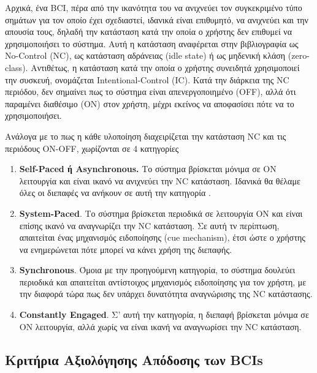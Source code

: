 \documentclass[11pt,a4paper,english,greek,twoside]{../Thesis}
\begin{document}
\par Αρχικά, ένα BCI, πέρα από την ικανότητα του να ανιχνεύει τον συγκεκριμένο τύπο σημάτων για τον οποίο έχει σχεδιαστεί, ιδανικά είναι επιθυμητό, να ανιχνεύει και την απουσία τους, δηλαδή την κατάσταση κατά την οποία ο χρήστης δεν επιθυμεί να χρησιμοποιήσει το σύστημα. Αυτή η κατάσταση αναφέρεται στην βιβλιογραφία ως No-Control (NC), ως κατάσταση αδράνειας (idle state) ή ως μηδενική κλάση (zero-class). Αντιθέτως, η κατάσταση κατά την οποία ο χρήστης συνειδητά χρησιμοποιεί την συσκευή, ονομάζεται Intentional-Control (IC). Κατά την διάρκεια της NC περιόδου, δεν σημαίνει πως το σύστημα είναι απενεργοποιημένο (OFF), αλλά ότι παραμένει διαθέσιμο (ON) στον χρήστη, μέχρι εκείνος να αποφασίσει πότε να το χρησιμοποιήσει. 

\par Ανάλογα με το πως η κάθε υλοποίηση διαχειρίζεται την κατάσταση NC και τις περιόδους ON-OFF, χωρίζονται σε 4 κατηγορίες \cite{Mason2006-ts}
\begin{enumerate}
    \item \textbf{Self-Paced ή Asynchronous.} Το σύστημα βρίσκεται μόνιμα σε ON λειτουργία και είναι ικανό να ανιχνεύει την NC κατάσταση. Ιδανικά θα θέλαμε όλες οι διεπαφές να ανήκουν σε αυτή την κατηγορία \cite{Muller-Putz2006-wj}. 
    \label{item:asynchronous}
    \item \textbf{System-Paced}. Το σύστημα βρίσκεται περιοδικά σε λειτουργία ON και είναι επίσης ικανό να αναγνωρίζει την NC κατάσταση. Σε αυτή τν περίπτωση, απαιτείται ένας μηχανισμός ειδοποίησης (cue mechanism), έτσι ώστε ο χρήστης να ενημερώνεται πότε μπορεί να κάνει χρήση της διεπαφής.
    \item \textbf{Synchronous}. Όμοια με την προηγούμενη κατηγορία, το σύστημα δουλεύει περιοδικά και απαιτείται αντίστοιχος μηχανισμός ειδοποίησης για τον χρήστη, με την διαφορά τώρα πως δεν υπάρχει δυνατότητα αναγνώρισης της NC κατάστασης.
    \item \textbf{Constantly Engaged}. Σ' αυτή την κατηγορία, η διεπαφή βρίσκεται μόνιμα σε ON λειτουργία, αλλά χωρίς να είναι ικανή να αναγνωρίσει την NC κατάσταση.
\end{enumerate}

  \subsection{Κριτήρια Αξιολόγησης Απόδοσης των BCIs}
  
\end{document}
